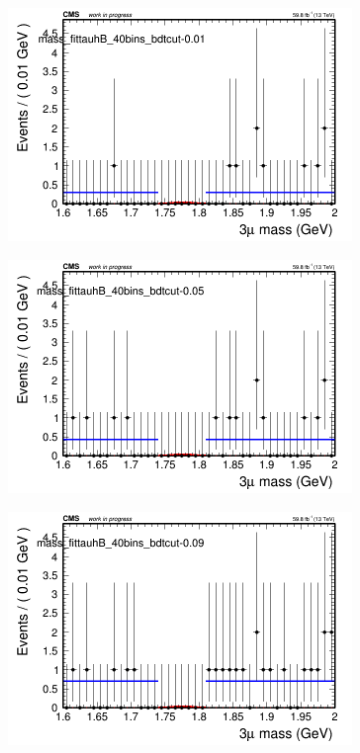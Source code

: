 \begin{figure}[H]
    \centering
    \begin{subfigure}{0.2\textwidth}
        \includegraphics[width=\textwidth]{flat_fit/plots/tauhB/massfit_tauhB_40bins_bdtcut-0.01.png}
        \caption{}
    \end{subfigure}
    \begin{subfigure}{0.2\textwidth}
        \includegraphics[width=\textwidth]{flat_fit/plots/tauhB/massfit_tauhB_40bins_bdtcut-0.05.png}
        \caption{}
    \end{subfigure}
    \begin{subfigure}{0.2\textwidth}
        \includegraphics[width=\textwidth]{flat_fit/plots/tauhB/massfit_tauhB_40bins_bdtcut-0.09.png}

\end{subfigure}
\end{figure}
